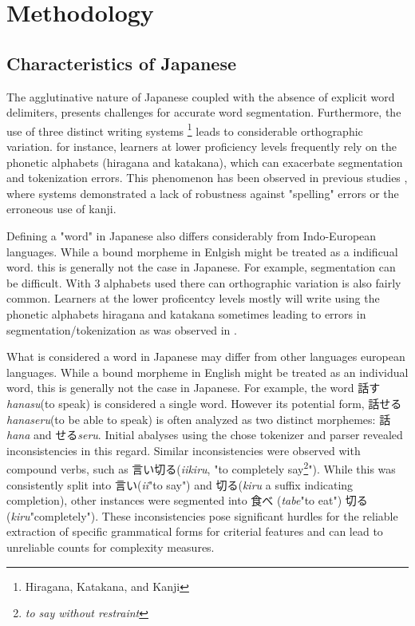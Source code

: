 \chapter{Methodology}
\section{Characteristics of Japanese}

The agglutinative nature of Japanese coupled with the absence of explicit word delimiters, presents challenges for
accurate word segmentation. Furthermore, the use of three distinct writing systems
\footnote{Hiragana, Katakana, and Kanji} leads to considerable orthographic variation. for instance, learners at
lower proficiency levels frequently rely on the phonetic alphabets (hiragana and katakana), which can exacerbate
segmentation and tokenization errors. This phenomenon has been observed in previous studies
\citep{yang1998, nagata2009}, where systems demonstrated a lack of robustness against "spelling" errors or the
erroneous use of kanji.

Defining a "word" in Japanese also differs considerably from Indo-European languages. While a bound morpheme in
Enlgish might be treated as a indificual word. this is generally not the case in Japanese. For example,
segmentation can be difficult.
With 3
alphabets used there can orthographic variation is also fairly common. Learners at the lower proficentcy levels
mostly will write using the phonetic alphabets hiragana and katakana sometimes leading to errors in
segmentation/tokenization as was observed in \citep{yang1998, nagata2009}.

What is considered a word in Japanese may differ from other languages european languages. While a bound morpheme in
English might be treated
as an individual word, this is generally not the case in Japanese. For example, the word 話す\textit{hanasu}(to speak)
is considered a single word. However its potential form, 話せる \textit{hanaseru}(to be able to speak) is often analyzed as
two distinct morphemes: 話\textit{hana} and せる\textit{seru}. Initial abalyses using the chose tokenizer and parser
revealed inconsistencies in this regard. Similar inconsistencies were observed with compound verbs, such as
言い切る(\textit{iikiru}, "to completely say\footnote{\textit{to say without restraint}}"). While this was consistently
split into 言い(\textit{ii}"to say") and 切る(\textit{kiru} a suffix indicating completion), other instances were
segmented into
食べ (\textit{tabe}"to eat") 切る(\textit{kiru}"completely"). These inconsistencies pose significant hurdles for the
reliable extraction of specific grammatical forms for criterial features and can lead to unreliable counts for
complexity measures.

